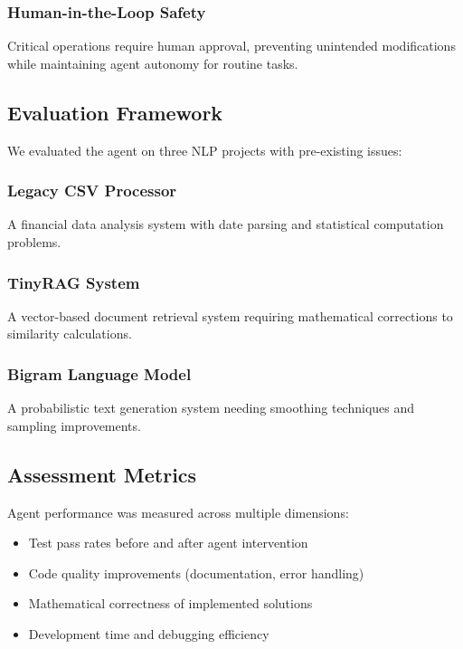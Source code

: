 \documentclass[12pt, a4paper]{article}
\begin{document}
\subsubsection{Human-in-the-Loop Safety}
Critical operations require human approval, preventing unintended modifications while maintaining agent autonomy for routine tasks.

\subsection{Evaluation Framework}

We evaluated the agent on three NLP projects with pre-existing issues:

\subsubsection{Legacy CSV Processor}
A financial data analysis system with date parsing and statistical computation problems.

\subsubsection{TinyRAG System}
A vector-based document retrieval system requiring mathematical corrections to similarity calculations.

\subsubsection{Bigram Language Model}
A probabilistic text generation system needing smoothing techniques and sampling improvements.

\subsection{Assessment Metrics}

Agent performance was measured across multiple dimensions:
\begin{itemize}
    \item Test pass rates before and after agent intervention
    \item Code quality improvements (documentation, error handling)
    \item Mathematical correctness of implemented solutions
    \item Development time and debugging efficiency
\end{itemize}

\end{document}
